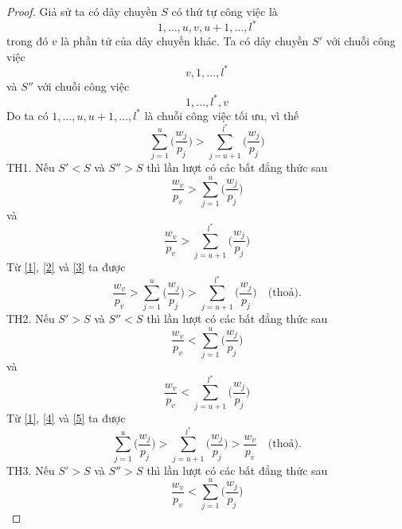 \documentclass[12pt,a4paper]{report}
\begin{document}
\begin{proof}
	Giả sử ta có dây chuyền $S$ có thứ tự công việc là 
	\begin{equation*}
	1,\ldots,u,v,u+1,\ldots,l^*
	\end{equation*}
	trong đó $v$ là phần tử của dây chuyền khác.
	Ta có dây chuyền $S'$ với chuỗi công việc
	\begin{equation*}
		v,1,\ldots,l^*
	\end{equation*}
	và $S''$ với chuỗi công việc
	\begin{equation*}
		1,\ldots,l^*,v
	\end{equation*}
	Do ta có $1,\ldots,u,u+1,\ldots,l^*$ là chuỗi công việc tối ưu, vì thế
	\begin{equation} \label{1}
		\sum_{j=1}^{u}\biggl(\frac{w_j}{p_j}\biggl) > \sum_{j=u+1}^{l^*}\biggl(\frac{w_j}{p_j}\biggl)
	\end{equation}
	TH1.
	Nếu $S' < S$ và $S''>S$ thì lần lượt có các bất đẳng thức sau
	\begin{equation} \label{2}
		\frac{w_v}{p_v} > \sum_{j=1}^{u}\biggl(\frac{w_j}{p_j}\biggr)
	\end{equation}
	và
	\begin{equation} \label{3}
		\frac{w_v}{p_v} > \sum_{j=u+1}^{l^*}\biggl(\frac{w_j}{p_j}\biggr)
	\end{equation}
	Từ \eqref{1}, \eqref{2} và \eqref{3} ta được
	\begin{equation}
		\frac{w_v}{p_v} > \sum_{j=1}^{u}\biggl(\frac{w_j}{p_j}\biggl) > \sum_{j=u+1}^{l^*}\biggl(\frac{w_j}{p_j}\biggl) \quad \text{(thoả).}
	\end{equation}
	TH2.
	Nếu $S' > S$ và $S'' < S$ thì lần lượt có các bất đẳng thức sau
	\begin{equation} \label{4}
		\frac{w_v}{p_v} < \sum_{j=1}^{u}\biggl(\frac{w_j}{p_j}\biggr)
	\end{equation}
	và
	\begin{equation} \label{5}
		\frac{w_v}{p_v} < \sum_{j=u+1}^{l^*}\biggl(\frac{w_j}{p_j}\biggr)
	\end{equation}
	Từ \eqref{1}, \eqref{4} và \eqref{5} ta được
	\begin{equation}
		 \sum_{j=1}^{u}\biggl(\frac{w_j}{p_j}\biggl) > \sum_{j=u+1}^{l^*}\biggl(\frac{w_j}{p_j}\biggl) > \frac{w_v}{p_v} \quad \text{(thoả).}
	\end{equation}
	TH3.
	Nếu $S' > S$ và $S'' > S$ thì lần lượt có các bất đẳng thức sau
	\begin{equation} \label{6}
		\frac{w_v}{p_v} < \sum_{j=1}^{u}\biggl(\frac{w_j}{p_j}\biggr)

\end{equation}
\end{proof}
\end{document}
